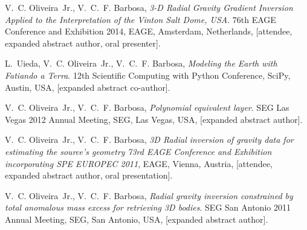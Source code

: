 \begin{thebibliography}{10}
V.~C. Oliveira~Jr., V.~C.~F. Barbosa, \emph{3-D Radial Gravity Gradient
  Inversion Applied to the Interpretation of the Vinton Salt Dome, USA}.
  {76th EAGE Conference and Exhibition 2014}, EAGE, Amsterdam,
  Netherlands, [attendee, expanded abstract author, oral presenter].

L.~Uieda, V.~C. Oliveira~Jr., V.~C.~F. Barbosa, \emph{Modeling the Earth with
  Fatiando a Terra}. {12th Scientific Computing with Python
  Conference}, SciPy, Austin, USA, [expanded abstract co-author].

V.~C. Oliveira~Jr., V.~C.~F. Barbosa, \emph{Polynomial equivalent layer}.
  {SEG Las Vegas 2012 Annual Meeting}, SEG, Las Vegas, USA,
  [expanded abstract author].

V.~C. Oliveira~Jr., V.~C.~F. Barbosa, \emph{3D Radial inversion of gravity data
  for estimating the source's geometry} \emph{73rd EAGE Conference and
  Exhibition incorporating SPE EUROPEC 2011}, EAGE, Vienna, Austria, [attendee,
  expanded abstract author, oral presentation].

V.~C. Oliveira~Jr., V.~C.~F. Barbosa, \emph{Radial gravity inversion
  constrained by total anomalous mass excess for retrieving 3D bodies}. 
  {SEG San Antonio 2011 Annual Meeting}, SEG, San Antonio, USA, [expanded
  abstract author].

\end{thebibliography}